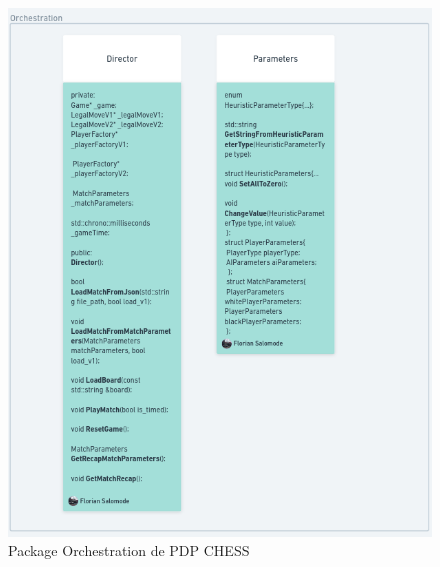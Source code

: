 \huge\documentclass{article}
\begin{document}
    \begin{figure}[!h]
        \centering
        \includegraphics[scale = 0.3]{img/Package/Orchestration.png}
        \caption{Package Orchestration de PDP CHESS}
        \label{pck:orchestration}
    \end{figure}
    \newpage
\end{document}
